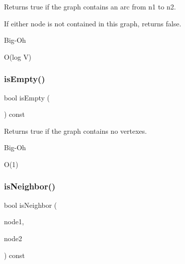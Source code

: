 Returns {\ttfamily true} if the graph contains an arc from {\ttfamily n1} to {\ttfamily n2}. 

If either node is not contained in this graph, returns false. \begin{DoxyRefDesc}{Big-\/\+Oh}
\item[\mbox{\hyperlink{BigOh__BigOh000079}{Big-\/\+Oh}}]O(log V) \end{DoxyRefDesc}
\mbox{\label{classGraph_acf82f9b2937375c7b1cf3dccb3df3312}} 
\subsubsection{\texorpdfstring{is\+Empty()}{isEmpty()}}
{\footnotesize\ttfamily bool is\+Empty (\begin{DoxyParamCaption}{ }\end{DoxyParamCaption}) const\hspace{0.3cm}{\ttfamily [inherited]}}



Returns {\ttfamily true} if the graph contains no vertexes. 

\begin{DoxyRefDesc}{Big-\/\+Oh}
\item[\mbox{\hyperlink{BigOh__BigOh000082}{Big-\/\+Oh}}]O(1) \end{DoxyRefDesc}
\mbox{\label{classGraph_ab160bb64995133f6feb351cb23b031fb}} 
\subsubsection{\texorpdfstring{is\+Neighbor()}{isNeighbor()}\hspace{0.1cm}{\footnotesize\ttfamily [1/2]}}
{\footnotesize\ttfamily bool is\+Neighbor (\begin{DoxyParamCaption}\item[{const std\+::string \&}]{node1,  }\item[{const std\+::string \&}]{node2 }\end{DoxyParamCaption}) const\hspace{0.3cm}{\ttfamily [inherited]}}



